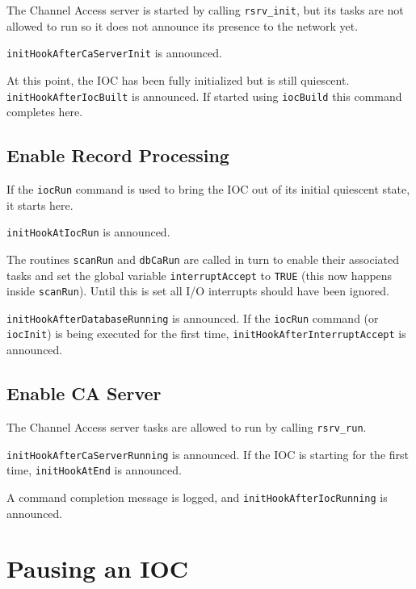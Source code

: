 The Channel Access server is started by calling \verb|rsrv_init|, but its tasks are not allowed to run so it does not announce 
its presence to the network yet.

\verb|initHookAfterCaServerInit| is announced.

At this point, the IOC has been fully initialized but is still quiescent. \verb|initHookAfterIocBuilt| is announced. If 
started using \verb|iocBuild| this command completes here.

\subsection{Enable Record Processing}

If the \verb|iocRun| command is used to bring the IOC out of its initial quiescent state, it starts here.

\verb|initHookAtIocRun| is announced.

The routines \verb|scanRun| and \verb|dbCaRun| are called in turn to enable their associated tasks and set the global variable 
\verb|interruptAccept| to \verb|TRUE| (this now happens inside \verb|scanRun|).
Until this is set all I/O interrupts should have been ignored.

\verb|initHookAfterDatabaseRunning| is announced. If the \verb|iocRun| command (or \verb|iocInit|) is being executed for the 
first time, \verb|initHookAfterInterruptAccept| is announced.

\subsection{Enable CA Server}

The Channel Access server tasks are allowed to run by calling \verb|rsrv_run|.

\verb|initHookAfterCaServerRunning| is announced. If the IOC is starting for the first time, \verb|initHookAtEnd| is 
announced.

A command completion message is logged, and \verb|initHookAfterIocRunning| is announced.

\section{Pausing an IOC}

